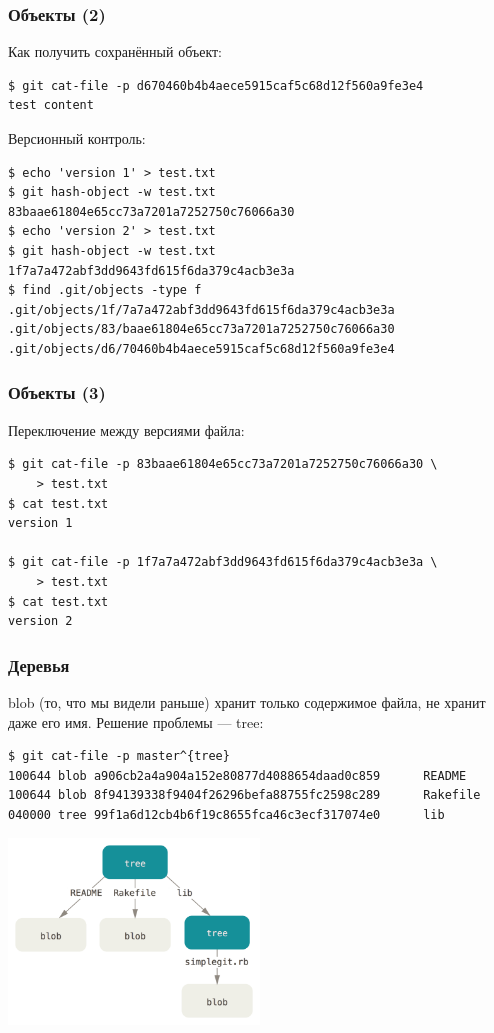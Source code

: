 \documentclass{../text-style}
\begin{document}
    \begin{frame}[fragile]
        \frametitle{Объекты (2)}
        Как получить сохранённый объект:
        \begin{verbatim}
$ git cat-file -p d670460b4b4aece5915caf5c68d12f560a9fe3e4
test content
        \end{verbatim}

        Версионный контроль:
        \begin{verbatim}
$ echo 'version 1' > test.txt
$ git hash-object -w test.txt
83baae61804e65cc73a7201a7252750c76066a30
$ echo 'version 2' > test.txt
$ git hash-object -w test.txt
1f7a7a472abf3dd9643fd615f6da379c4acb3e3a
$ find .git/objects -type f
.git/objects/1f/7a7a472abf3dd9643fd615f6da379c4acb3e3a
.git/objects/83/baae61804e65cc73a7201a7252750c76066a30
.git/objects/d6/70460b4b4aece5915caf5c68d12f560a9fe3e4
        \end{verbatim}
    \end{frame}

    \begin{frame}[fragile]
        \frametitle{Объекты (3)}
        Переключение между версиями файла:
        \begin{verbatim}
$ git cat-file -p 83baae61804e65cc73a7201a7252750c76066a30 \
    > test.txt
$ cat test.txt
version 1

$ git cat-file -p 1f7a7a472abf3dd9643fd615f6da379c4acb3e3a \
    > test.txt
$ cat test.txt
version 2
        \end{verbatim}
    \end{frame}

    \begin{frame}[fragile]
        \frametitle{Деревья}
        blob (то, что мы видели раньше) хранит только содержимое файла, не хранит даже его имя. Решение проблемы --- tree:
        \begin{scriptsize}
        \begin{verbatim}
$ git cat-file -p master^{tree}
100644 blob a906cb2a4a904a152e80877d4088654daad0c859      README
100644 blob 8f94139338f9404f26296befa88755fc2598c289      Rakefile
040000 tree 99f1a6d12cb4b6f19c8655fca46c3ecf317074e0      lib
        \end{verbatim}
        \end{scriptsize}
        \begin{center}
            \includegraphics[width=0.5\textwidth]{gitTreeObject.png}
        \end{center}
    \end{frame}
\end{document}
